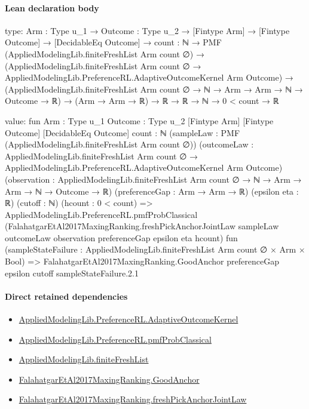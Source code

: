 \documentclass[10pt]{article}
\begin{document}
\paragraph{Lean declaration body}
\begin{ReviewVerbatim}
type:
{Arm : Type u_1} →
  {Outcome : Type u_2} →
    [Fintype Arm] →
      [Fintype Outcome] →
        [DecidableEq Outcome] →
          {count : ℕ} →
            PMF (AppliedModelingLib.finiteFreshList Arm count ∅) →
              (AppliedModelingLib.finiteFreshList Arm count ∅ →
                  AppliedModelingLib.PreferenceRL.AdaptiveOutcomeKernel Arm Outcome) →
                (AppliedModelingLib.finiteFreshList Arm count ∅ → ℕ → Arm → Arm → ℕ → Outcome → ℝ) →
                  (Arm → Arm → ℝ) → ℝ → ℝ → ℕ → 0 < count → ℝ

value:
fun {Arm : Type u_1} {Outcome : Type u_2} [Fintype Arm] [Fintype Outcome] [DecidableEq Outcome] {count : ℕ}
    (sampleLaw : PMF (AppliedModelingLib.finiteFreshList Arm count ∅))
    (outcomeLaw :
      AppliedModelingLib.finiteFreshList Arm count ∅ →
        AppliedModelingLib.PreferenceRL.AdaptiveOutcomeKernel Arm Outcome)
    (observation : AppliedModelingLib.finiteFreshList Arm count ∅ → ℕ → Arm → Arm → ℕ → Outcome → ℝ)
    (preferenceGap : Arm → Arm → ℝ) (epsilon eta : ℝ) (cutoff : ℕ) (hcount : 0 < count) =>
  AppliedModelingLib.PreferenceRL.pmfProbClassical
    (FalahatgarEtAl2017MaxingRanking.freshPickAnchorJointLaw sampleLaw outcomeLaw observation preferenceGap epsilon eta
      hcount)
    fun (sampleStateFailure : AppliedModelingLib.finiteFreshList Arm count ∅ × Arm × Bool) =>
    FalahatgarEtAl2017MaxingRanking.GoodAnchor preferenceGap epsilon cutoff sampleStateFailure.2.1
\end{ReviewVerbatim}

\paragraph{Direct retained dependencies}
\begin{itemize}\raggedright
\item \hyperlink{governing-declaration-1bbfda940769438f}{Applied\allowbreak{}Modeling\allowbreak{}Lib.\allowbreak{}Preference\allowbreak{}RL.\allowbreak{}Adaptive\allowbreak{}Outcome\allowbreak{}Kernel}
\item \hyperlink{governing-declaration-7adb8ad5ca0d515c}{Applied\allowbreak{}Modeling\allowbreak{}Lib.\allowbreak{}Preference\allowbreak{}RL.\allowbreak{}pmf\allowbreak{}Prob\allowbreak{}Classical}
\item \hyperlink{governing-declaration-9a06ef56935bbfee}{Applied\allowbreak{}Modeling\allowbreak{}Lib.\allowbreak{}finite\allowbreak{}Fresh\allowbreak{}List}
\item \hyperlink{paper-prerequisite-46128be8e1edb4b6}{Falahatgar\allowbreak{}Et\allowbreak{}Al2017\allowbreak{}Maxing\allowbreak{}Ranking.\allowbreak{}Good\allowbreak{}Anchor}
\item \hyperlink{governing-declaration-fa06cda9514d76f5}{Falahatgar\allowbreak{}Et\allowbreak{}Al2017\allowbreak{}Maxing\allowbreak{}Ranking.\allowbreak{}fresh\allowbreak{}Pick\allowbreak{}Anchor\allowbreak{}Joint\allowbreak{}Law}
\end{itemize}
\hypertarget{governing-declaration-c9504cf8a39d2ae0}{}
\end{document}
